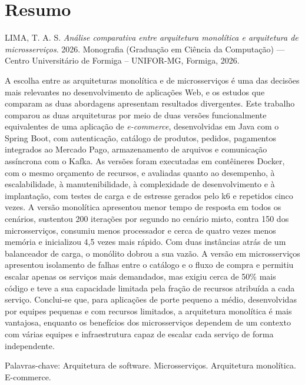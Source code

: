 \chapter*{Resumo}

\small
\noindent LIMA, T. A. S. \emph{Análise comparativa entre arquitetura monolítica e
arquitetura de microsserviços}. 2026. Monografia (Graduação em Ciência da Computação)
--- Centro Universitário de Formiga -- UNIFOR-MG, Formiga, 2026.

\normalsize \vspace{1cm} \onehalfspacing

\noindent A escolha entre as arquiteturas monolítica e de microsserviços é uma das decisões
mais relevantes no desenvolvimento de aplicações Web, e os estudos que comparam as duas
abordagens apresentam resultados divergentes. Este trabalho comparou as duas arquiteturas por
meio de duas versões funcionalmente equivalentes de uma aplicação de \textit{e-commerce},
desenvolvidas em Java com o Spring Boot, com autenticação, catálogo de produtos, pedidos,
pagamentos integrados ao Mercado Pago, armazenamento de arquivos e comunicação assíncrona com o
Kafka. As versões foram executadas em contêineres Docker, com o mesmo orçamento de recursos, e
avaliadas quanto ao desempenho, à escalabilidade, à manutenibilidade, à complexidade de
desenvolvimento e à implantação, com testes de carga e de estresse gerados pelo k6 e repetidos
cinco vezes. A versão monolítica apresentou menor tempo de resposta em todos os cenários,
sustentou 200 iterações por segundo no cenário misto, contra 150 dos microsserviços, consumiu
menos processador e cerca de quatro vezes menos memória e inicializou 4,5 vezes mais rápido.
Com duas instâncias atrás de um balanceador de carga, o monólito dobrou a sua vazão. A versão em
microsserviços apresentou isolamento de falhas entre o catálogo e o fluxo de compra e permitiu
escalar apenas os serviços mais demandados, mas exigiu cerca de 50\% mais código e teve a sua
capacidade limitada pela fração de recursos atribuída a cada serviço. Conclui-se que, para
aplicações de porte pequeno a médio, desenvolvidas por equipes pequenas e com recursos
limitados, a arquitetura monolítica é mais vantajosa, enquanto os benefícios dos microsserviços
dependem de um contexto com várias equipes e infraestrutura capaz de escalar cada serviço de
forma independente.

\vfill%
\noindent Palavras-chave: Arquitetura de software. Microsserviços. Arquitetura monolítica. E-commerce.
